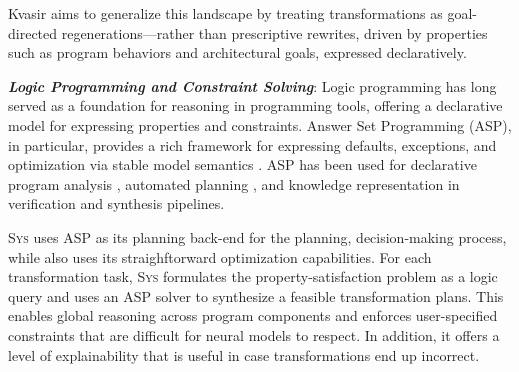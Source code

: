 \documentclass[sigplan]{acmart}
\newcommand{\sys}{{\scshape Sys}\xspace}
\newcommand{\heading}[1]{\vspace{2pt}\noindent\textbf{\emph{#1}}:\enspace}
\begin{document}
Kvasir aims to generalize this landscape by treating transformations as
goal-directed regenerations---rather than prescriptive rewrites, driven by
properties such as program behaviors and architectural goals, expressed declaratively.

\heading{Logic Programming and Constraint Solving}
Logic programming has long served as a foundation for reasoning in programming
tools, offering a declarative model for expressing properties and constraints.
Answer Set Programming (ASP), in particular, provides a rich framework for
expressing defaults, exceptions, and optimization via stable model semantics
\cite{Gelfond_2000, Gelfond_2002, Eiter_2009}. ASP has been used for
declarative program analysis \cite{benton2007interactive}, automated planning
\cite{nguyen2020explainable, son2022answersetplanningsurvey}, and knowledge
representation in verification and synthesis pipelines.

\sys uses ASP as its planning back-end for the planning, decision-making
process, while also uses its straighftorward optimization capabilities.
For each transformation task, \sys formulates the property-satisfaction problem as a logic query and uses an ASP solver to
synthesize a feasible transformation plans.
This enables global reasoning across program components and enforces
user-specified constraints that are difficult for neural models to respect.
In addition, it offers a level of explainability that is useful in case transformations end up incorrect.



\end{document}
